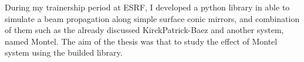 During my trainership period at ESRF, I developed a python library in able to simulate a beam propagation along simple surface conic mirrors, and combination of them such as the already discussed KirckPatrick-Baez and another system, named Montel. The aim of the thesis was that to study the effect of Montel system using the builded library. 
\medskip
%
%
%
%
\endgroup			
%
%
